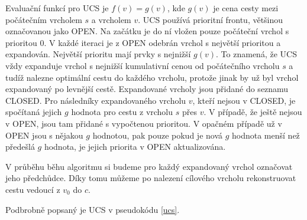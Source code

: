 \documentclass[12pt]{report}			%
\begin{document}
			Evaluační funkcí pro UCS je $f(v) = g(v)$, kde $g(v)$ je cena cesty mezi počátečním vrcholem $s$ a vrcholem $v$. 
			UCS používá prioritní frontu, většinou označovanou jako OPEN. Na začátku je do ní vložen pouze počáteční vrchol s prioritou 0. V každé iteraci je z OPEN odebrán vrchol s největší prioritou a expandován. Největší prioritu mají prvky s nejnižší $g(v)$. To znamená, že UCS vždy expanduje vrchol s nejnižší kumulativní cenou od počátečního vrcholu $s$ a tudíž nalezne optimální cestu do každého vrcholu, protože jinak by už byl vrchol expandovaný po levnější cestě. Expandované vrcholy jsou přidané do seznamu CLOSED. Pro následníky expandovaného vrcholu $v$, kteří nejsou v CLOSED, je spočítaná jejich $g$ hodnota pro cestu z vrcholu $s$ přes $v$. V případě, že ještě nejsou v OPEN, jsou tam přidané s vypočtenou prioritou. V opačném případě už v OPEN jsou s nějakou $g$ hodnotou, pak pouze pokud je nová $g$ hodnota menší než předešlá $g$ hodnota, je jejich priorita v OPEN aktualizována.
			
			 V průběhu běhu algoritmu si budeme pro každý expandovaný vrchol označovat jeho předchůdce. Díky tomu můžeme po nalezení cílového vrcholu rekonstruovat cestu vedoucí z $v_0$ do $c$.
			
			
			
			Podbrobně popsaný je UCS v pseudokódu \ref{ucs}.
			
\end{document}
